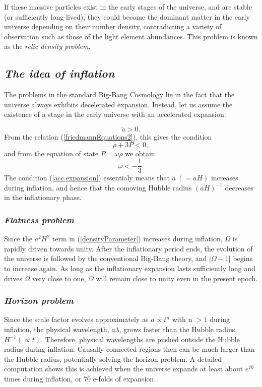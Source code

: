 \documentclass[11pt,a4paper,twoside]{book}
\begin{document}
If these massive particles exist in the early stages of the universe, and  are stable (or sufficiently long-lived), they could become the dominant matter in the early universe depending on their number density,  contradicting a variety of observation such as those of the light element abundances. This problem is known as the \textit{relic density problem}.

\subsection*{\emph{The idea of inflation}}

The problems in the standard Big-Bang Cosmology lie in the fact that the universe always exhibits decelerated expansion. Instead, let us assume  the existence of a stage in the early universe with an accelerated expansion: 

\begin{equation}
	\label{acc.expansion}
		\ddot{a} > 0.
\end{equation}
From the relation (\ref{friedmannEquations2}), this gives the condition
\begin{equation}
	\label{equationOfState}
	\rho + 3P < 0,
\end{equation}
and from  the equation of state $ P = \omega \rho  $ we obtain 
\begin{equation}
	\label{w parameter}
	\omega < -\frac{1}{3}.
\end{equation}
The condition (\ref{acc.expansion}) essentialy means that $ \dot{a}\ (= aH) $ increases during inflation, and hence that the comoving Hubble radius $ (aH)^{-1} $ decreases in the inflationary phase.

\subsubsection*{\textit{Flatness problem}}
Since the $ a^{2}H^{2} $ term in (\ref{densityParameter}) increases during inflation, $ \Omega $ is rapidly driven towards unity. After the inflationary period ends, the evolution of the universe is followed by the conventional Big-Bang theory, and $|\Omega-1| $ begins to increase again. As long as the inflationary expansion lasts sufficiently long and drives $ \Omega $ very close to one, $ \Omega $  will remain close to unity even in the present epoch.  

\subsubsection*{\textit{Horizon problem}}
Since the scale factor evolves approximately as $ a \propto t^{n} $ with n $ > 1 $ during inflation, the physical wavelength, $a \lambda $, grows faster than the Hubble radius, $ H^{-1}(\propto t)$. Therefore, physical wavelengths are pushed outside the Hubble radius during inflation.  Causally connected regions then can be much larger than the Hubble radius, potentially solving the horizon problem. A detailed computation shows this is achieved when the universe expands at least about $ e^{70} $ times during inflation, or 70 e-folds of expansion \cite{Liddle:intro}.
\end{document}
